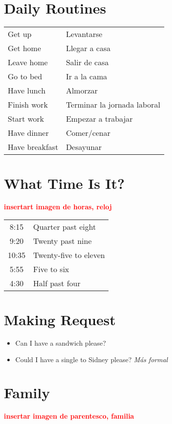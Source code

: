 \documentclass{elegantbook}
\begin{document}
        \section{Daily Routines}
        \begin{center}
            \begin{tabular}{|l|l|}
                \hline
                Get up&Levantarse\\
                Get home&Llegar a casa\\
                Leave home&Salir de casa\\
                Go to bed&Ir a la cama\\
                Have lunch&Almorzar\\
                Finish work&Terminar la jornada laboral\\
                Start work&Empezar a trabajar\\
                Have dinner&Comer/cenar\\
                Have breakfast&Desayunar\\
                \hline
            \end{tabular}
        \end{center}
        \section{What Time Is It?}
        \textcolor{red}{\textbf{insertart imagen de horas, reloj}}\\
        \begin{tabular}{cl}
            8:15&Quarter past eight\\
            9:20&Twenty past nine\\
            10:35&Twenty-five to eleven\\
            5:55&Five to six\\
            4:30&Half past four\\
        \end{tabular}
        \section{Making Request}
        \begin{itemize}
            \item Can I have a sandwich please?
            \item Could I have a single to Sidney please? \emph{Más formal}
        \end{itemize}
        \section{Family}
        \textcolor{red}{\textbf{insertar imagen de parentesco, familia}}
\end{document}
